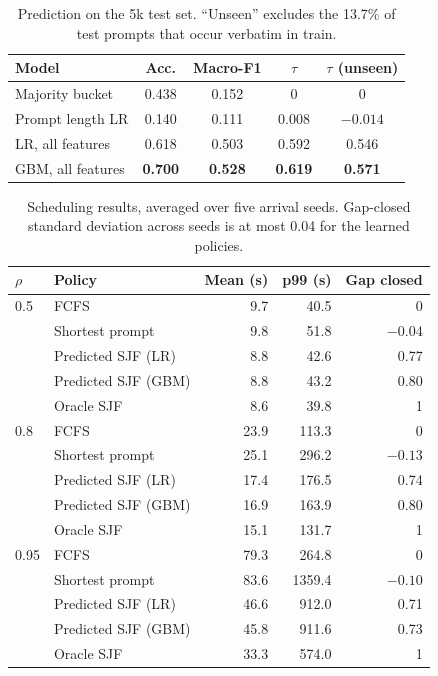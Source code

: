 \documentclass[10pt,twocolumn]{article}
\begin{document}
\begin{table}[t]
\centering\small
\setlength{\tabcolsep}{4pt}
\begin{tabular}{lcccc}
\toprule
Model & Acc. & Macro-F1 & $\tau$ & $\tau$ (unseen) \\
\midrule
Majority bucket & 0.438 & 0.152 & 0 & 0 \\
Prompt length LR & 0.140 & 0.111 & 0.008 & $-0.014$ \\
LR, all features & 0.618 & 0.503 & 0.592 & 0.546 \\
GBM, all features & \textbf{0.700} & \textbf{0.528} & \textbf{0.619} & \textbf{0.571} \\
\bottomrule
\end{tabular}
\vspace{-0.4em}
\caption{Prediction on the 5k test set. ``Unseen'' excludes the 13.7\% of test prompts that occur verbatim in train.}
\label{tab:pred}
\end{table}

\begin{table}[t]
\centering\small
\setlength{\tabcolsep}{3pt}
\begin{tabular}{llrrr}
\toprule
$\rho$ & Policy & Mean (s) & p99 (s) & Gap closed \\
\midrule
0.5 & FCFS & 9.7 & 40.5 & 0 \\
 & Shortest prompt & 9.8 & 51.8 & $-0.04$ \\
 & Predicted SJF (LR) & 8.8 & 42.6 & 0.77 \\
 & Predicted SJF (GBM) & 8.8 & 43.2 & 0.80 \\
 & Oracle SJF & 8.6 & 39.8 & 1 \\
\midrule
0.8 & FCFS & 23.9 & 113.3 & 0 \\
 & Shortest prompt & 25.1 & 296.2 & $-0.13$ \\
 & Predicted SJF (LR) & 17.4 & 176.5 & 0.74 \\
 & Predicted SJF (GBM) & 16.9 & 163.9 & 0.80 \\
 & Oracle SJF & 15.1 & 131.7 & 1 \\
\midrule
0.95 & FCFS & 79.3 & 264.8 & 0 \\
 & Shortest prompt & 83.6 & 1359.4 & $-0.10$ \\
 & Predicted SJF (LR) & 46.6 & 912.0 & 0.71 \\
 & Predicted SJF (GBM) & 45.8 & 911.6 & 0.73 \\
 & Oracle SJF & 33.3 & 574.0 & 1 \\
\bottomrule
\end{tabular}
\vspace{-0.4em}
\caption{Scheduling results, averaged over five arrival seeds. Gap-closed standard deviation across seeds is at most 0.04 for the learned policies.}
\label{tab:sched}
\end{table}
\end{document}
